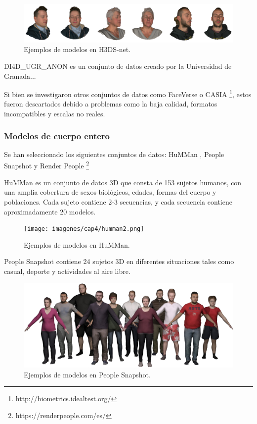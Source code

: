 \begin{figure}[h]
	\centering
	\includegraphics[scale=0.18]{imagenes/cap4/h3dsnet4_1.png}
	\caption[Ejemplos H3DS-net.]{Ejemplos de modelos en H3DS-net.}
	\label{fig18}
\end{figure}

DI4D\_UGR\_ANON es un conjunto de datos creado por la Universidad de Granada...

Si bien se investigaron otros conjuntos de datos como FaceVerse \cite{64} o CASIA \footnote{http://biometrics.idealtest.org/}, estos fueron descartados debido a problemas como la baja calidad, formatos incompatibles y escalas no reales.

\subsubsection{Modelos de cuerpo entero}
Se han seleccionado los siguientes conjuntos de datos: HuMMan \cite{62}, People Snapshot \cite{63} y Render People \footnote{https://renderpeople.com/es/}

HuMMan \cite{62} es un conjunto de datos 3D que consta de 153 sujetos humanos, con una amplia cobertura de sexos biológicos, edades, formas del cuerpo y poblaciones. Cada sujeto contiene 2-3 secuencias, y cada secuencia contiene aproximadamente 20 modelos.

\begin{figure}[h]
	\centering
	\texttt{[image: imagenes/cap4/humman2.png]}
	\caption[Ejemplos HuMMan.]{Ejemplos de modelos en HuMMan.}
	\label{fig19}
\end{figure}

People Snapshot \cite{63} contiene 24 sujetos 3D en diferentes situaciones tales como casual, deporte y actividades al aire libre.

\begin{figure}[h]
	\centering
	\includegraphics[scale=0.5]{imagenes/cap4/snapshot2.png}
	\caption[Ejemplos People Snapshot]{Ejemplos de modelos en People Snapshot.}
	\label{fig20}
\end{figure}

